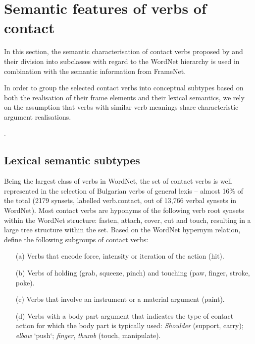 \documentclass[output=paper,colorlinks,citecolor=brown]{langscibook}
\begin{document}
\section{Semantic features of verbs of contact}\label{ch5:sec:4}
In this section, the semantic characterisation of contact verbs proposed by \citet{Miller1990} and their division into subclasses with regard to the WordNet hierarchy is used in combination with the semantic information from FrameNet.

In order to group the selected contact verbs into conceptual subtypes based on both the realisation of their frame elements and their lexical semantics, we rely on the assumption that verbs with similar verb meanings share characteristic argument realisations.

.

\subsection{Lexical semantic subtypes}
Being the largest class of verbs in WordNet, the set of contact verbs is well represented in the selection of Bulgarian verbs of general lexis -- almost 16\% of the total (2179 synsets, labelled verb.contact, out of 13,766 verbal synsets in WordNet). Most contact verbs are hyponyms of the following verb root synsets within the WordNet structure: fasten, attach, cover, cut and touch, resulting in a large tree structure within the set. Based on the WordNet hypernym relation, \citet [59]{Miller1990} define the following subgroups of contact verbs:

\begin{itemize}
\item[(a)] Verbs that encode force, intensity or iteration of the action (hit).

\item[(b)] Verbs of holding (grab, squeeze, pinch) and touching (paw, finger, stroke, poke).

\item[(c)] Verbs that involve an instrument or a material argument (paint).

\item[(d)] Verbs with a body part argument that indicates the type of contact action for which the body part is typically used: \textit{Shoulder} (support, carry); \textit{elbow} ‘push`; \textit{finger}, \textit{thumb} (touch, manipulate).
\end{itemize}
\end{document}
